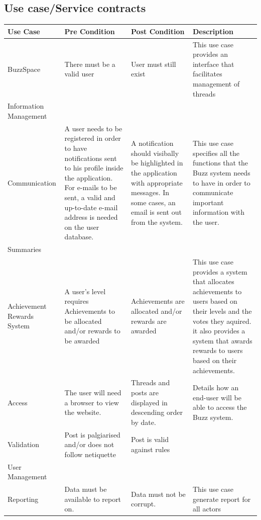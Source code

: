 \documentclass[a4paper,12pt]{report}
\begin{document}
\subsection{Use case/Service contracts}
\begin{center}
  \begin{tabular}{| p{3cm} | p{4cm} | p{4cm} | p{4cm} |}
    \hline
    Use Case & Pre Condition & Post Condition & Description \\ \hline \hline
    BuzzSpace & There must be a valid user & User must still exist & This use case provides an interface that facilitates management of threads\\ \hline
    Information Management &  &  &\\ \hline
    Communication& A user needs to be registered in order to have notifications sent to his profile inside the application. For e-mails to be sent, a valid and up-to-date e-mail address is needed on the user database. & A notification should visibally be highlighted in the application with appropriate messages. In some cases, an email is sent out from the system. & This use case specifies all the functions that the Buzz system needs to have in order to communicate important information with the user. \\ \hline
    Summaries &  &  & \\ \hline
    Achievement Rewards System & A user's level requires Achievements to be allocated and/or rewards to be awarded & Achievements are allocated and/or rewards are awarded & This use case provides a system that allocates achievements to users based on their levels and the votes they aquired. it also provides a system that awards rewards to users based on their achievements.\\ \hline
    Access & The user will need a browser to view the website. & Threads and posts are displayed in descending order by date. & Details how an end-user will be able to access the Buzz system. \\ \hline
    Validation & Post is palgiarised and/or does not follow netiquette & Post is valid against rules  & \\ \hline
    User Management &  &  & \\ \hline
    Reporting & Data must be available to report on. & Data must not be corrupt. & This use case generate report for all actors\\ \hline
    \hline
  \end{tabular}
\end{center}
\end{document}
